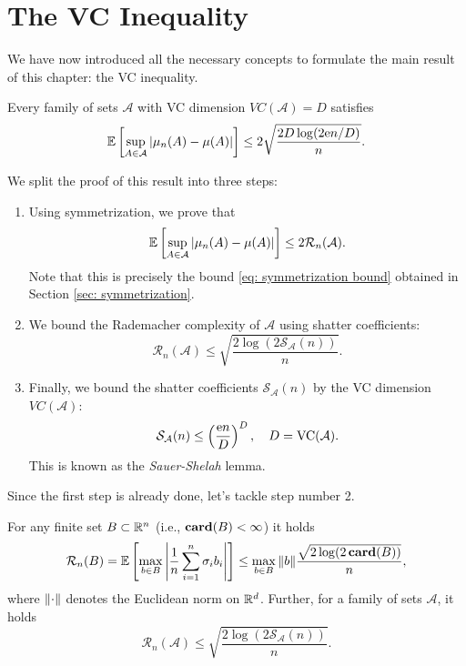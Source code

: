 \section{The VC Inequality}
\label{sec: VC inequality}

We have now introduced all the necessary concepts to formulate the main result of this chapter: the VC inequality.

\begin{theorem}[VC Inequality]
Every family of sets $\mathcal{A}$ with VC dimension $VC(\mathcal{A}) = D$ satisfies
\[
    \mathbb{E}\left[ \sup_{A \in \mathcal{A}} \abs{\mu_n(A) - \mu(A)} \right] \leq 2 \sqrt{\frac{2D \log(2 \mathrm{e} n / D)}{n}}.
\]
\end{theorem}

We split the proof of this result into three steps:

\begin{enumerate}
    \item Using symmetrization, we prove that
    \[
        \mathbb{E}\left[ \sup_{A \in \mathcal{A}} \abs{\mu_n(A) - \mu(A)} \right] \leq 2 \mathcal{R}_n(\mathcal{A}).
    \]
    Note that this is precisely the bound \eqref{eq: symmetrization bound} obtained in Section \ref{sec: symmetrization}.

    \item We bound the Rademacher complexity of $\mathcal{A}$ using shatter coefficients:
    \[
        \mathcal{R}_n(\mathcal{A}) \leq \sqrt{ \frac{2 \log(2 \mathcal{S}_{\mathcal{A}}(n)) }{n} }.
    \]

    \item Finally, we bound the shatter coefficients $\mathcal{S}_{\mathcal{A}}(n)$ by the VC dimension $VC(\mathcal{A})$:
    \[
        \mathcal{S}_{\mathcal{A}}(n) \leq \left( \frac{\mathrm{e} n}{D} \right)^D, \quad D = \mathrm{VC}(\mathcal{A}).
    \]
    This is known as the \emph{Sauer-Shelah} lemma.
\end{enumerate}

Since the first step is already done, let's tackle step number 2.

\begin{lemma}
\label{lem: rademacher complexity of finite set}
For any finite set $B \subset \mathbb{R}^n$ (i.e., $\mathrm{\mathbf{card}}(B) < \infty$) it holds
\[
    \mathcal{R}_n(B) = \mathbb{E}\left[\max_{b \in B} \abs{ \frac{1}{n} \sum_{i=1}^n \sigma_i b_i}\right] \leq \max_{b \in B} \norm{b} \frac{\sqrt{2 \log(2 \, \mathrm{\mathbf{card}}(B))}}{n},
\]
where $\norm{\cdot}$ denotes the Euclidean norm on $\mathbb{R}^d$. Further, for a family of sets $\mathcal{A}$, it holds
\[
    \mathcal{R}_n(\mathcal{A}) \leq \sqrt{ \frac{2 \log(2 \mathcal{S}_{\mathcal{A}}(n)) }{n} }.
\]
\end{lemma}

